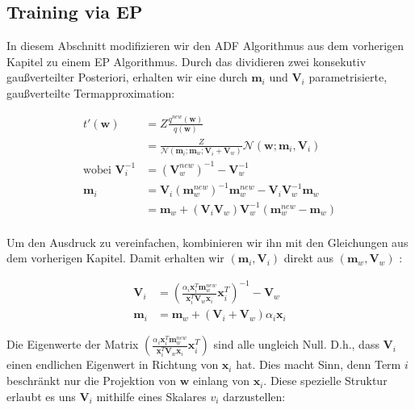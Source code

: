 \documentclass[12pt,a4paper]{scrartcl}
\numberwithin{equation}{section}
\begin{document}
{  \subsection{Training via EP}
  
  In diesem Abschnitt modifizieren wir den ADF Algorithmus aus dem vorherigen Kapitel zu einem EP Algorithmus. 
  Durch das dividieren zwei konsekutiv gaußverteilter Posteriori, erhalten wir eine durch $\mathbf{m}_i$ und $\mathbf{V}_i$ parametrisierte,
  gaußverteilte Termapproximation: 
  
  \begin{equation}
  \begin{split}
   t'(\mathbf{w}) &= Z \frac{q^{new}(\mathbf{w})}{q(\mathbf{w})} \\ 
   &= \frac{Z}{\mathcal{N}(\mathbf{m}_i;\mathbf{m}_w;\mathbf{V}_i + \mathbf{V}_w)} \mathcal{N}(\mathbf{w}; \mathbf{m}_i,\mathbf{V}_i) \\
   \text{wobei } \mathbf{V}_i^{-1} &= (\mathbf{V}_w^{new})^{-1} - \mathbf{V}_w^{-1} \\ 
   \mathbf{m}_i &= \mathbf{V}_i (\mathbf{m}_w^{new})^{-1} \mathbf{m}_w^{new} - \mathbf{V}_i \mathbf{V}_w^{-1} \mathbf{m}_w \\
   &= \mathbf{m}_w + (\mathbf{V}_i \mathbf{V}_w) \mathbf{V}_w^{-1}(\mathbf{m}_w^{new} - \mathbf{m}_w) \\
  \end{split}
  \end{equation}
  
  Um den Ausdruck zu vereinfachen, kombinieren wir ihn mit den Gleichungen aus dem vorherigen Kapitel. Damit
  erhalten wir $(\mathbf{m}_i, \mathbf{V}_i)$ direkt aus $(\mathbf{m}_w, \mathbf{V}_w)$ : 
  
  \begin{equation}
  \begin{split}
   \mathbf{V}_i &= (\frac{ \alpha_i \mathbf{x}_i^T \mathbf{m}_w^{new} }{ \mathbf{x}_i^T \mathbf{V}_w \mathbf{x}_i } \mathbf{x}_i^T)^{-1} - \mathbf{V}_w \\
   \mathbf{m}_i &= \mathbf{m}_w + (\mathbf{V}_i + \mathbf{V}_w) \alpha_i \mathbf{x}_i 
   \end{split}  
  \end{equation}

  Die Eigenwerte der Matrix $(\frac{ \alpha_i \mathbf{x}_i^T \mathbf{m}_w^{new} }{ \mathbf{x}_i^T \mathbf{V}_w \mathbf{x}_i } \mathbf{x}_i^T)$ sind alle ungleich Null. 
  D.h., dass $\mathbf{V}_i$ einen endlichen Eigenwert in Richtung von $\mathbf{x}_i$ hat. 
  Dies macht Sinn, denn Term $i$ beschränkt nur die Projektion von $\mathbf{w}$ einlang von $\mathbf{x}_i$. 
  Diese spezielle Struktur erlaubt es uns $\mathbf{V}_i$ mithilfe eines Skalares $v_i$ darzustellen: 
  
}
\end{document}
